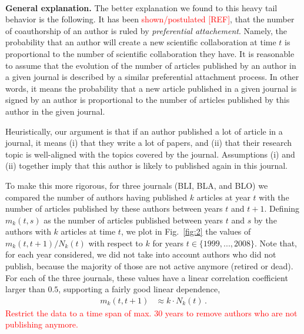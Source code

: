 \documentclass[aps,prl,floatfix,twocolumn]{revtex4-1}
\begin{document}


\paragraph{}
{\bf General explanation. }
The better explanation we found to this heavy tail behavior is the following. 
It has been \textcolor{red}{shown/postulated [REF]}, that the number of coauthorship of an author is ruled by \emph{preferential attachement}. 
Namely, the probability that an author will create a new scientific collaboration at time $t$ is proportional to the number of scientific collaboration they have. 
It is reasonable to assume that the evolution of the number of articles published by an author in a given journal is described by a similar preferential attachment process. 
In other words, it means the probability that a new article published in a given journal 
is signed by an author is proportional to the number of articles published by this author in the given journal. 

Heuristically, our argument is that if an author published a lot of article in a journal, it means (i) that they write a lot of papers, 
and (ii) that their research topic is well-aligned with the topics covered by the journal. 
Assumptions (i) and (ii) together imply that this author is likely to published again in this journal. 

To make this more rigorous, for three journals (BLI, BLA, and BLO) we compared the number of authors having published $k$ articles at year $t$ 
with the number of articles published by these authors between years $t$ and $t+1$. 
Defining $m_k(t,s)$ as the number of articles published between years $t$ and $s$ by the authors with $k$ articles at time $t$, we plot in Fig.~\ref{fig:2} the values of $m_k(t,t+1)/N_k(t)$ with respect to $k$ for years $t\in\{1999,...,2008\}$. 
Note that, for each year considered, we did not take into account authors who did not publish, because the majority of those are not active anymore (retired or dead). 
For each of the three journals, these values have a linear correlation coefficient larger than $0.5$, supporting a fairly good linear dependence, 
\begin{align}\label{eq:prop}
 m_k(t,t+1) &\approx k\cdot N_k(t)\, . 
\end{align}
\textcolor{red}{Restrict the data to a time span of max. 30 years to remove authors who are not publishing anymore.}
\end{document}
